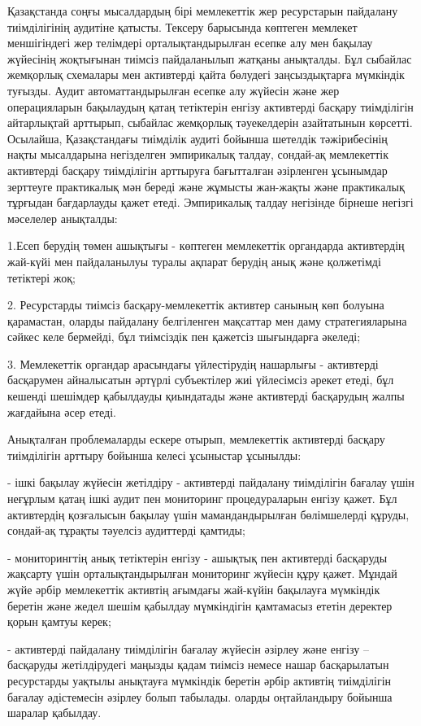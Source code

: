 \begin{multicols}{2}
Қазақстанда соңғы мысалдардың бірі мемлекеттік жер ресурстарын пайдалану
тиімділігінің аудитіне қатысты. Тексеру барысында көптеген мемлекет
меншігіндегі жер телімдері орталықтандырылған есепке алу мен бақылау
жүйесінің жоқтығынан тиімсіз пайдаланылып жатқаны анықталды. Бұл
сыбайлас жемқорлық схемалары мен активтерді қайта бөлудегі
заңсыздықтарға мүмкіндік туғызды. Аудит автоматтандырылған есепке алу
жүйесін және жер операцияларын бақылаудың қатаң тетіктерін енгізу
активтерді басқару тиімділігін айтарлықтай арттырып, сыбайлас жемқорлық
тәуекелдерін азайтатынын көрсетті. Осылайша, Қазақстандағы тиімділік
аудиті бойынша шетелдік тәжірибесінің нақты мысалдарына негізделген
эмпирикалық талдау, сондай-ақ мемлекеттік активтерді басқару тиімділігін
арттыруға бағытталған әзірленген ұсынымдар зерттеуге практикалық мән
береді және жұмысты жан-жақты және практикалық тұрғыдан бағдарлауды
қажет етеді. Эмпирикалық талдау негізінде бірнеше негізгі мәселелер
анықталды:

1.Есеп берудің төмен ашықтығы - көптеген мемлекеттік органдарда
активтердің жай-күйі мен пайдаланылуы туралы ақпарат берудің анық және
қолжетімді тетіктері жоқ;

2. Ресурстарды тиімсіз басқару-мемлекеттік активтер санының көп болуына
қарамастан, оларды пайдалану белгіленген мақсаттар мен даму
стратегияларына сәйкес келе бермейді, бұл тиімсіздік пен қажетсіз
шығындарға әкеледі;

3. Мемлекеттік органдар арасындағы үйлестірудің нашарлығы - активтерді
басқарумен айналысатын әртүрлі субъектілер жиі үйлесімсіз әрекет етеді,
бұл кешенді шешімдер қабылдауды қиындатады және активтерді басқарудың
жалпы жағдайына әсер етеді.

Анықталған проблемаларды ескере отырып, мемлекеттік активтерді басқару
тиімділігін арттыру бойынша келесі ұсыныстар ұсынылды:

- ішкі бақылау жүйесін жетілдіру - активтерді пайдалану тиімділігін
бағалау үшін неғұрлым қатаң ішкі аудит пен мониторинг процедураларын
енгізу қажет. Бұл активтердің қозғалысын бақылау үшін мамандандырылған
бөлімшелерді құруды, сондай-ақ тұрақты тәуелсіз аудиттерді қамтиды;

- мониторингтің анық тетіктерін енгізу - ашықтық пен активтерді
басқаруды жақсарту үшін орталықтандырылған мониторинг жүйесін құру
қажет. Мұндай жүйе әрбір мемлекеттік активтің ағымдағы жай-күйін
бақылауға мүмкіндік беретін және жедел шешім қабылдау мүмкіндігін
қамтамасыз ететін деректер қорын қамтуы керек;

- активтерді пайдалану тиімділігін бағалау жүйесін әзірлеу және енгізу
-- басқаруды жетілдірудегі маңызды қадам тиімсіз немесе нашар
басқарылатын ресурстарды уақтылы анықтауға мүмкіндік беретін әрбір
активтің тиімділігін бағалау әдістемесін әзірлеу болып табылады. оларды
оңтайландыру бойынша шаралар қабылдау.


\end{multicols}
